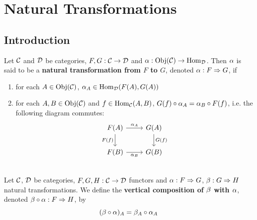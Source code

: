 \documentclass{book}
\begin{document}
	
	
	
	
	
	
	
	
	
	
	
	
	
	
	
	
	
	
	
	
	
	
	
	
	
	
	
	
	
	
	
	
	
	
	
	
	
	
	
	
	
	\newpage
	\chapter{Natural Transformations}
	
	\section{Introduction}
	
	\begin{defn} 
		Let $\mathcal{C}$ and $\mathcal{D}$ be categories, $F, G: \mathcal{C} \rightarrow \mathcal{D}$ and $ \alpha : \operatorname{Obj}(\mathcal{C}) \rightarrow  \operatorname{Hom}_{\mathcal{D}}$. Then $\alpha$ is said to be a \textbf{natural transformation from $F$ to $G$}, denoted $\alpha: F \Rightarrow G$, if
		\begin{enumerate}
			\item for each $A \in \operatorname{Obj}(\mathcal{C})$, $\alpha_A \in \operatorname{Hom}_{\mathcal{D}}(F(A), G(A))$
			\item for each $A, B \in \operatorname{Obj}(\mathcal{C})$ and $f \in \operatorname{Hom}_{\mathcal{C}}(A,B)$, $G(f) \circ \alpha_A = \alpha_B \circ F(f)$, i.e. the following diagram commutes: 
			\[ 
			\begin{tikzcd}
				F(A)  \arrow[r, "\al_A"]  \arrow[d, "F(f)"']  & G(A)   \arrow[d, "G(f)"]\\
				F(B) \arrow[r, "\al_B"'] &  G(B) 
			\end{tikzcd}
			\]
		\end{enumerate}
	\end{defn}
	
	
	\begin{defn}   \\
		Let $\mathcal{C}$, $\mathcal{D}$ be categories, $F, G, H:\mathcal{C} \rightarrow \mathcal{D}$ functors and $\alpha: F \Rightarrow G$, $\beta : G \Rightarrow H$ natural transformations. We define the \textbf{vertical composition of $\beta$ with $\alpha$}, denoted $\beta \circ \alpha: F \Rightarrow H$, by 
		$$(\beta \circ \alpha)_{A} = \beta_A \circ \alpha_A$$ 
	\end{defn}
	
\end{document}
